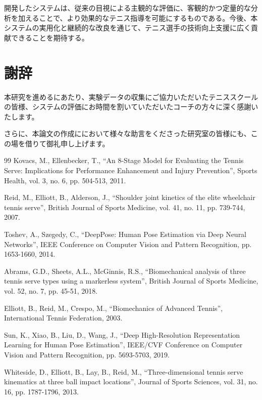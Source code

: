 \documentclass[oneside]{suribt}[11pt]
\begin{document}
開発したシステムは、従来の目視による主観的な評価に、客観的かつ定量的な分析を加えることで、より効果的なテニス指導を可能にするものである。今後、本システムの実用化と継続的な改良を通じて、テニス選手の技術向上支援に広く貢献できることを期待する。

\chapter{謝辞}
本研究を進めるにあたり、実験データの収集にご協力いただいたテニススクールの皆様、システムの評価にお時間を割いていただいたコーチの方々に深く感謝いたします。

さらに、本論文の作成ににおいて様々な助言をくださった研究室の皆様にも、この場を借りて御礼申し上げます。

\backmatter

\begin{thebibliography}{99}
     Kovacs, M., Ellenbecker, T., ``An 8-Stage Model for Evaluating the Tennis Serve: Implications for Performance Enhancement and Injury Prevention'', Sports Health, vol. 3, no. 6, pp. 504-513, 2011.
    
     Reid, M., Elliott, B., Alderson, J., ``Shoulder joint kinetics of the elite wheelchair tennis serve'', British Journal of Sports Medicine, vol. 41, no. 11, pp. 739-744, 2007.
    
     Toshev, A., Szegedy, C., ``DeepPose: Human Pose Estimation via Deep Neural Networks'', IEEE Conference on Computer Vision and Pattern Recognition, pp. 1653-1660, 2014.
    
     Abrams, G.D., Sheets, A.L., McGinnis, R.S., ``Biomechanical analysis of three tennis serve types using a markerless system'', British Journal of Sports Medicine, vol. 52, no. 7, pp. 45-51, 2018.
    
     Elliott, B., Reid, M., Crespo, M., ``Biomechanics of Advanced Tennis'', International Tennis Federation, 2003.
    
     Sun, K., Xiao, B., Liu, D., Wang, J., ``Deep High-Resolution Representation Learning for Human Pose Estimation'', IEEE/CVF Conference on Computer Vision and Pattern Recognition, pp. 5693-5703, 2019.
    
     Whiteside, D., Elliott, B., Lay, B., Reid, M., ``Three-dimensional tennis serve kinematics at three ball impact locations'', Journal of Sports Sciences, vol. 31, no. 16, pp. 1787-1796, 2013.
    

\end{thebibliography}
\end{document}
